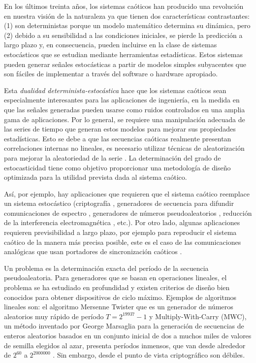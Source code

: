 En los últimos treinta años, los sistemas caóticos han producido una revolución en nuestra visión de la naturaleza ya que tienen dos características contrastantes:
(1) son deterministas porque un modelo matemático determina su dinámica, pero
(2) debido a su sensibilidad a las condiciones iniciales, se pierde la predicción a largo plazo y, en consecuencia, pueden incluirse en la clase de sistemas estocásticos que se estudian mediante herramientas estadísticas.
Estos sistemas pueden generar señales estocásticas a partir de modelos simples subyacentes que son fáciles de implementar a través del software o hardware apropiado.

Esta \emph{dualidad determinista-estocástica} hace que los sistemas caóticos sean especialmente interesantes para las aplicaciones de ingeniería, en la medida en que las señales generadas pueden usarse como ruidos controlados en una amplia gama de aplicaciones.
Por lo general, se requiere una manipulación adecuada de las series de tiempo que generan estos modelos para mejorar sus propiedades estadísticas.
Esto se debe a que las secuencias caóticas realmente presentan correlaciones internas no lineales, es necesario utilizar técnicas de aleatorización para mejorar la aleatoriedad de la serie \cite{DeMicco2008}.
La determinación del grado de estocasticidad tiene como objetivo proporcionar una metodología de diseño optimizada para la utilidad prevista dada al sistema caótico.

Así, por ejemplo, hay aplicaciones que requieren que el sistema caótico reemplace un sistema estocástico (criptografía \cite{Fernandez2003}, generadores de secuencia para difundir comunicaciones de espectro \cite{Setti2004, DeMicco2007B}, generadores de números pseudoaleatorios \cite{Kocarev2003, Larrondo2006, DeMicco2009}, reducción de la interferencia electromagnética \cite{Callegari2003A}, etc.).
Por otro lado, algunas aplicaciones requieren previsibilidad a largo plazo, por ejemplo para reproducir el sistema caótico de la manera más precisa posible, este es el caso de las comunicaciones analógicas que usan portadores de sincronización caóticos \cite{Kocarev1995, Hidalgo2001}.

Un problema es la determinación exacta del período de la secuencia pseudoaleatoria.
Para generadores que se basan en operaciones lineales, el problema se ha estudiado en profundidad y existen criterios de diseño bien conocidos para obtener dispositivos de ciclo máximo.
Ejemplos de algoritmos lineales son: el algoritmo Mersenne Twister que es un generador de números aleatorios muy rápido de período $T = 2^{19937} - 1$ \cite{Matsumoto1998} y Multiply-With-Carry (MWC), un método inventado por George Marsaglia para la generación de secuencias de enteros aleatorios basados en un conjunto inicial de dos a muchos miles de valores de semilla elegidos al azar, presenta períodos inmensos, que van desde alrededor de $2 ^ {60}$ a $2 ^ {2000000}$ \cite{Marsaglia1991}.
Sin embargo, desde el punto de vista criptográfico son débiles.


